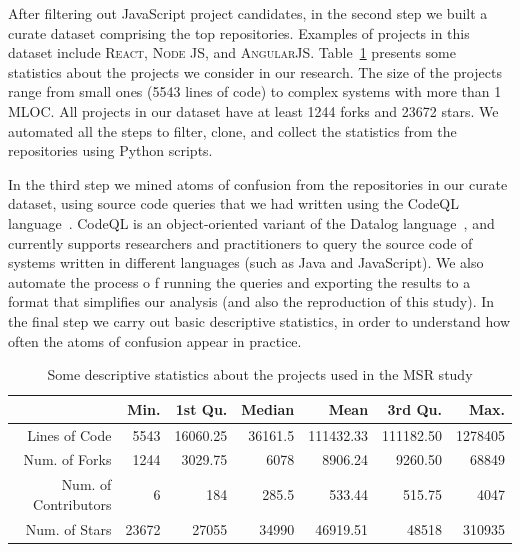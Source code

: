 After filtering out JavaScript project candidates, in the second step we built a curate dataset comprising the top \minedprojects repositories. Examples of projects in this dataset include \textsc{React}, \textsc{Node JS}, and \textsc{AngularJS}. Table~\ref{tab:projects-statistics} presents some statistics about the projects we consider in our research. The size of the projects range from small ones (5543 lines of code) to complex systems with more than 1 MLOC. All projects in our dataset have at least \num{1244} forks and \num{23672} stars. We automated all the steps to filter, clone, and collect the statistics from the repositories using Python scripts.

In the third step we mined atoms of confusion from the repositories in our curate dataset, using source code queries that we had written using the CodeQL language~\cite{moor:gttse2007}. CodeQL is an object-oriented variant of the Datalog language~\cite{rodriguez2020efficient}, and currently supports researchers and practitioners to query the source code of systems written in different languages (such as Java and JavaScript). We also automate the process o
f running the queries and exporting the results to a format that simplifies our
analysis (and also the reproduction of this study). In the final step we carry
out basic descriptive statistics, in order to understand how often the
atoms of confusion appear in practice. 

\begin{table}[ht]
 \centering
 \begin{tabular}{rrrrrrr}
   \hline
             & Min. & 1st Qu. & Median & Mean & 3rd Qu. & Max. \\ \hline
 Lines of Code           & \num{5543}  & \num{16060.25} & \num{36161.5} & \num{111432.33} & \num{111182.50} & \num{1278405} \\
 Num. of Forks     & \num{1244}   & \num{3029.75} & \num{6078} & \num{8906.24} & \num{9260.50} & \num{68849} \\
 Num. of Contributors  & \num{6}   & \num{184} & \num{285.5} & \num{533.44} & \num{515.75} & \num{4047} \\
 Num. of Stars        & \num{23672} & \num{27055} & \num{34990} & \num{46919.51} & \num{48518} & \num{310935} \\
 
    \hline
 \end{tabular}
 \caption{Some descriptive statistics about the projects used in the MSR study}
 \label{tab:projects-statistics} 
 \end{table}


